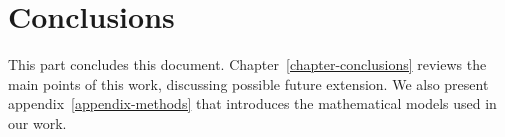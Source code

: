 \part{Conclusions} %

\label{part:conclusions} %


This part concludes this document. Chapter~\ref{chapter-conclusions} reviews the main points of this work, discussing possible future extension. We also present appendix~\ref{appendix-methods} that introduces the mathematical models used in our work.


 
